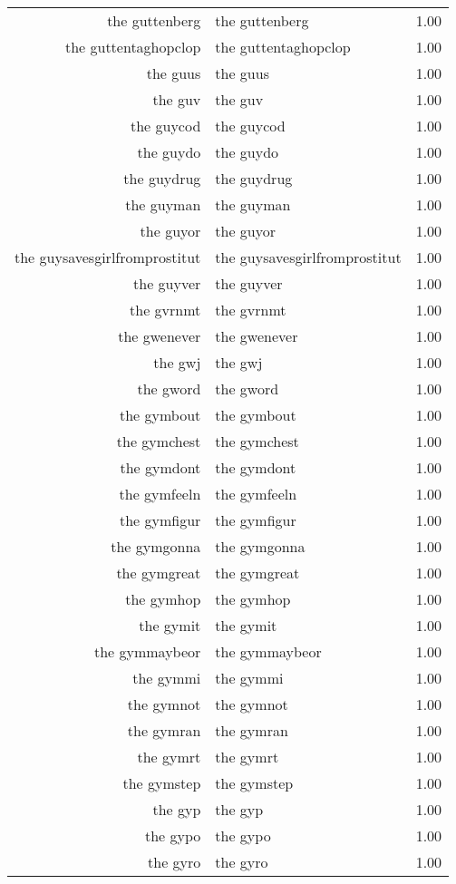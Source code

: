 \begin{table}[ht]
\begin{tabular}{rlr}
  the guttenberg & the guttenberg & 1.00 \\ 
  the guttentaghopclop & the guttentaghopclop & 1.00 \\ 
  the guus & the guus & 1.00 \\ 
  the guv & the guv & 1.00 \\ 
  the guycod & the guycod & 1.00 \\ 
  the guydo & the guydo & 1.00 \\ 
  the guydrug & the guydrug & 1.00 \\ 
  the guyman & the guyman & 1.00 \\ 
  the guyor & the guyor & 1.00 \\ 
  the guysavesgirlfromprostitut & the guysavesgirlfromprostitut & 1.00 \\ 
  the guyver & the guyver & 1.00 \\ 
  the gvrnmt & the gvrnmt & 1.00 \\ 
  the gwenever & the gwenever & 1.00 \\ 
  the gwj & the gwj & 1.00 \\ 
  the gword & the gword & 1.00 \\ 
  the gymbout & the gymbout & 1.00 \\ 
  the gymchest & the gymchest & 1.00 \\ 
  the gymdont & the gymdont & 1.00 \\ 
  the gymfeeln & the gymfeeln & 1.00 \\ 
  the gymfigur & the gymfigur & 1.00 \\ 
  the gymgonna & the gymgonna & 1.00 \\ 
  the gymgreat & the gymgreat & 1.00 \\ 
  the gymhop & the gymhop & 1.00 \\ 
  the gymit & the gymit & 1.00 \\ 
  the gymmaybeor & the gymmaybeor & 1.00 \\ 
  the gymmi & the gymmi & 1.00 \\ 
  the gymnot & the gymnot & 1.00 \\ 
  the gymran & the gymran & 1.00 \\ 
  the gymrt & the gymrt & 1.00 \\ 
  the gymstep & the gymstep & 1.00 \\ 
  the gyp & the gyp & 1.00 \\ 
  the gypo & the gypo & 1.00 \\ 
  the gyro & the gyro & 1.00 \\ 

\end{tabular}
\end{table}
